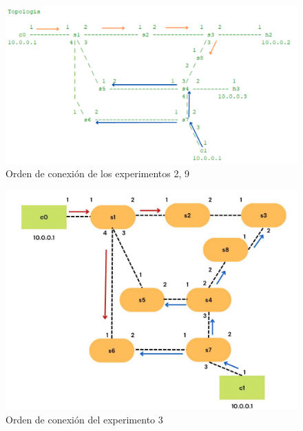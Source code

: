 \documentclass[a4paper, 12pt]{book}
\begin{document}
 	\begin{figure}[H]
 		\centering
 		\includegraphics[width=16cm, keepaspectratio]{img/escenario1_2c_2}
 		\caption{Orden de conexión de los experimentos 2, 9}
 		\label{figura:escenario1_2c_2}
 	\end{figure}
 	
 	\begin{figure}[H]
 		\centering
 		\includegraphics[width=16cm, keepaspectratio]{img/escenario1_2c_3}
 		\caption{Orden de conexión del experimento 3}
 		\label{figura:escenario_2c_3}
 	\end{figure}
 	
\end{document}
